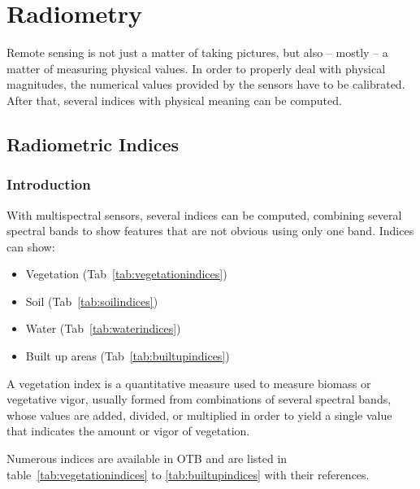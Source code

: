 \chapter{Radiometry}

Remote sensing is not just a matter of taking pictures, but also --
mostly -- a matter of measuring physical values. In order to properly
deal with physical magnitudes, the numerical values provided by the
sensors have to be calibrated. After that, several indices with
physical meaning can be computed.

\section{Radiometric Indices}
\label{sec:VegetationIndex}
\label{sec:RadiometricIndex}

\subsection{Introduction}

With multispectral sensors, several indices can be computed, combining several
spectral bands to show features that are not obvious using only one band.
Indices can show:
\begin{itemize}
  \item Vegetation (Tab~\ref{tab:vegetationindices})
  \item Soil (Tab~\ref{tab:soilindices})
  \item Water (Tab~\ref{tab:waterindices})
  \item Built up areas (Tab~\ref{tab:builtupindices})
\end{itemize}

A vegetation index is a quantitative measure used to measure biomass
or vegetative vigor, usually formed from combinations of several
spectral bands, whose values are added, divided, or multiplied in
order to yield a single value that indicates the amount or vigor of
vegetation.

Numerous indices are available in OTB and are listed in
table~\ref{tab:vegetationindices} to \ref{tab:builtupindices} with their
references.

